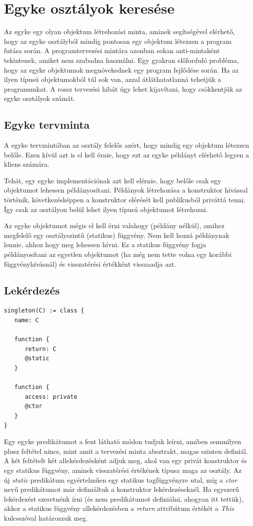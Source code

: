 \documentclass[a4paper,12pt]{report}
\begin{document}
\section{Egyke osztályok keresése}
Az egyke egy olyan objektum létrehozási minta, aminek segítségével elérhető, hogy az egyke osztályból mindig pontosan egy objektum létezzen a program futása során. A programtervezési mintára azonban sokan anti-mintaként tekintenek, amiket nem szabadna használni. Egy gyakran előforduló probléma, hogy az egyke objektumok megnövekednek egy program fejlődése során. Ha az ilyen típusú objektumokból túl sok van, azzal átláthatatlanná tehetjük a programunkat. A rossz tervezési hibát úgy lehet kijavítani, hogy csökkentjük az egyke osztályok számát.
\subsection{Egyke tervminta}
A egyke tervmintában az osztály felelős azért, hogy mindig egy objektum létezzen belőle. Ezen kívül azt is el kell érnie, hogy ezt az egyke példányt elérhető legyen a kliens számára.
\par Tehát, egy egyke implementációnak azt kell elérnie, hogy belőle csak egy objektumot lehessen példányosítani. Példányok létrehozása a konstruktor hívással történik, következésképpen a konstruktor elérését kell publikusból priváttá tenni. Így csak az osztályon belül lehet ilyen típusú objektumot létrehozni.
\par Az egyke objektumot mégis el kell érni valahogy (példány nélkül), amihez megfelelő egy osztályszintű (statikus) függvény. Nem kell hozzá példánynak lennie, ahhoz hogy meg lehessen hívni. Ez a statikus függvény fogja példányosítani az egyetlen objektumot (ha még nem tette volna egy korábbi függvényhívásnál) és visszatérési értékként visszaadja azt.
\subsection{Lekérdezés}
\begin{verbatim}
singleton(C) := class {
   name: C

   function {
      return: C
      @static
   }

   function {
      access: private 
      @ctor      
   }
}
\end{verbatim}
\par Egy egyke predikátumot a fent látható módon tudjuk leírni, amiben semmilyen plusz feltétel nincs, mint amit a tervezési minta absztrakt, magas szinten definiál. A két feltételt két allekérdezésként adjuk meg, ahol van egy privát konstruktor és egy statikus függvény, aminek visszatérési értékének típusa maga az osztály. Az új \textit{static} predikátum egyértelműen egy statikus tagfüggvényre utal, míg a \textit{ctor} nevű predikátumot már definiáltuk a konstruktor lekérdezéseknél. Ha egyszerű lekérdezést szeretnénk írni (és nem predikátumot definiálni, ahogyan itt tettük), akkor a statikus függvény allekérdezésben a \textit{return} attribútum értékét a \textit{This} kulcsszóval határozzuk meg.
\end{document}
